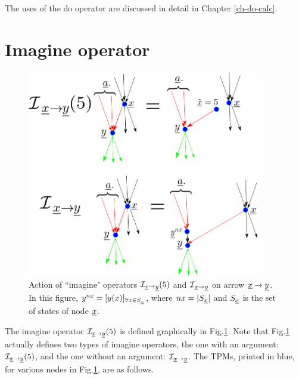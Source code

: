 The uses of the do operator are discussed
in detail in Chapter \ref{ch-do-calc}.

\section{Imagine operator}

\begin{figure}[h!]
\centering
\includegraphics[width=4in]
{counterf/kappa.png}
\caption{Action of ``imagine" operators
${\cal I}_{{\underline{x}}\rightarrow {\underline{y}}}(5)$
and ${\cal I}_{{\underline{x}}\rightarrow {\underline{y}}}$
on arrow ${\underline{x}}\rightarrow {\underline{y}}$.
In this figure, $y^{nx}=[y(x)]_{\forall x\in S_{\underline{x}}}$,
where $nx=|S_{\underline{x}}|$
and $S_{\underline{x}}$ is the set of states of node ${\underline{x}}$.
}
\label{fig-kappa}
\end{figure}

The imagine operator  ${\cal I}_{{\underline{x}}\rightarrow {\underline{y}}}(5)$
is defined graphically in Fig.\ref{fig-kappa}.
Note that Fig.\ref{fig-kappa}
actually defines two types
of imagine operators, the one
with an argument:
${\cal I}_{{\underline{x}}\rightarrow {\underline{y}}}(5)$,
and the one without an argument:
${\cal I}_{{\underline{x}}\rightarrow {\underline{y}}}$.
The TPMs, printed in blue,
for various nodes in
Fig.\ref{fig-kappa}, are as follows.



